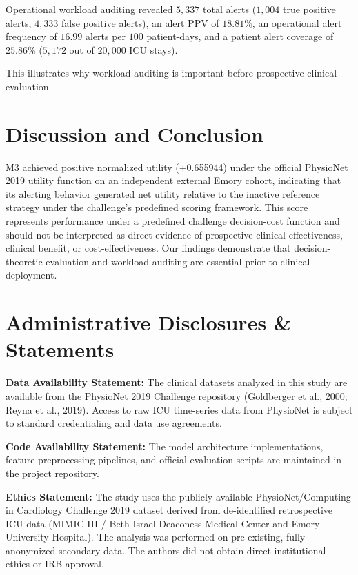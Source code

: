 \documentclass[11pt,a4paper]{article}
\begin{document}
Operational workload auditing revealed $5,337$ total alerts ($1,004$ true positive alerts, $4,333$ false positive alerts), an alert PPV of $18.81\%$, an operational alert frequency of $16.99$ alerts per $100$ patient-days, and a patient alert coverage of $25.86\%$ ($5,172$ out of $20,000$ ICU stays).

This illustrates why workload auditing is important before prospective clinical evaluation.

\section{Discussion and Conclusion}
M3 achieved positive normalized utility (+0.655944) under the official PhysioNet 2019 utility function on an independent external Emory cohort, indicating that its alerting behavior generated net utility relative to the inactive reference strategy under the challenge's predefined scoring framework. This score represents performance under a predefined challenge decision-cost function and should not be interpreted as direct evidence of prospective clinical effectiveness, clinical benefit, or cost-effectiveness. Our findings demonstrate that decision-theoretic evaluation and workload auditing are essential prior to clinical deployment.

\section*{Administrative Disclosures \& Statements}

\textbf{Data Availability Statement:} The clinical datasets analyzed in this study are available from the PhysioNet 2019 Challenge repository (Goldberger et al., 2000; Reyna et al., 2019). Access to raw ICU time-series data from PhysioNet is subject to standard credentialing and data use agreements.

\textbf{Code Availability Statement:} The model architecture implementations, feature preprocessing pipelines, and official evaluation scripts are maintained in the project repository.

\textbf{Ethics Statement:} The study uses the publicly available PhysioNet/Computing in Cardiology Challenge 2019 dataset derived from de-identified retrospective ICU data (MIMIC-III / Beth Israel Deaconess Medical Center and Emory University Hospital). The analysis was performed on pre-existing, fully anonymized secondary data. The authors did not obtain direct institutional ethics or IRB approval.
\end{document}
